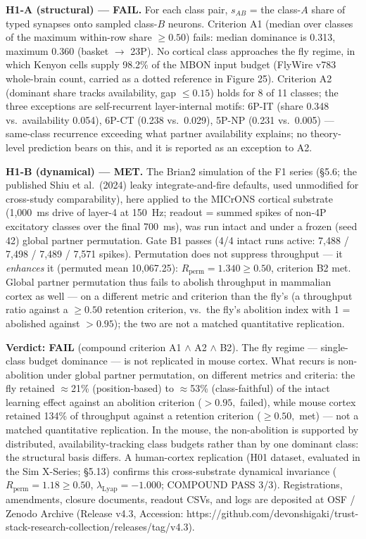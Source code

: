 \documentclass[
]{article}
\begin{document}
\textbf{H1-A (structural) --- FAIL.} For each class pair, \(s_{AB}\) =
the class-\(A\) share of typed synapses onto sampled class-\(B\)
neurons. Criterion A1 (median over classes of the maximum within-row
share \(\geq
0.50\)) fails: median dominance is 0.313, maximum 0.360 (basket \(\to\)
23P). No cortical class approaches the fly regime, in which Kenyon cells
supply 98.2\% of the MBON input budget (FlyWire v783 whole-brain count,
carried as a dotted reference in Figure 25). Criterion A2 (dominant
share tracks availability, gap \(\leq 0.15\)) holds for 8 of 11 classes;
the three exceptions are self-recurrent layer-internal motifs: 6P-IT
(share 0.348 vs.~availability 0.054), 6P-CT (0.238 vs.~0.029), 5P-NP
(0.231 vs.~0.005) --- same-class recurrence exceeding what partner
availability explains; no theory-level prediction bears on this, and it
is reported as an exception to A2.

\textbf{H1-B (dynamical) --- MET.} The Brian2 simulation of the F1
series (§5.6; the published Shiu et al.~(2024) leaky integrate-and-fire
defaults, used unmodified for cross-study comparability), here applied
to the MICrONS cortical substrate (1,000~ms drive of layer-4 at 150~Hz;
readout = summed spikes of non-4P excitatory classes over the final
700~ms), was run intact and under a frozen (seed 42) global partner
permutation. Gate B1 passes (4/4 intact runs active: 7,488 / 7,498 /
7,489 / 7,571 spikes). Permutation does not suppress throughput --- it
\emph{enhances} it (permuted mean 10,067.25):
\(R_{\mathrm{perm}} = 1.340 \geq 0.50\), criterion B2 met. Global
partner permutation thus fails to abolish throughput in mammalian cortex
as well --- on a different metric and criterion than the fly's (a
throughput ratio against a \(\geq 0.50\) retention criterion, vs.~the
fly's abolition index with 1 = abolished against \(>0.95\)); the two are
not a matched quantitative replication.

\textbf{Verdict: FAIL} (compound criterion A1 \(\wedge\) A2 \(\wedge\)
B2). The fly regime --- single-class budget dominance --- is not
replicated in mouse cortex. What recurs is non-abolition under global
partner permutation, on different metrics and criteria: the fly retained
\(\approx\)21\% (position-based) to \(\approx\)53\% (class-faithful) of
the intact learning effect against an abolition criterion (\(>0.95,\)
failed), while mouse cortex retained 134\% of throughput against a
retention criterion (\(\geq 0.50,\) met) --- not a matched quantitative
replication. In the mouse, the non-abolition is supported by
distributed, availability-tracking class budgets rather than by one
dominant class: the structural basis differs. A human-cortex replication
(H01 dataset, evaluated in the Sim X-Series; §5.13) confirms this
cross-substrate dynamical invariance
(\(R_{\mathrm{perm}} = 1.18 \ge 0.50\),
\(\lambda_{\mathrm{Lyap}} = -1.000\); COMPOUND PASS 3/3). Registrations,
amendments, closure documents, readout CSVs, and logs are deposited at
OSF / Zenodo Archive (Release v4.3, Accession:
https://github.com/devonshigaki/trust-stack-research-collection/releases/tag/v4.3).
\end{document}
